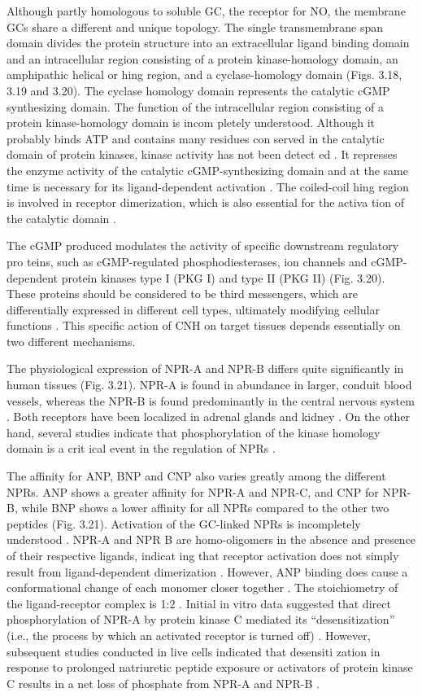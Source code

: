 \documentclass[14pt,a4paper,onecolumn]{extarticle}
\begin{document}
Although partly homologous to soluble GC, the receptor for NO, the membrane GCs share a different and unique topology. The single transmembrane span domain divides the protein structure into an extracellular ligand binding domain and an intracellular region consisting of a protein kinase-homology domain, an amphipathic helical or hing region, and a cyclase-homology domain \citep{165} (Figs. 3.18, 3.19 and 3.20). The cyclase homology domain represents the catalytic cGMP synthesizing domain. The function of the intracellular region consisting of a protein kinase-homology domain is incom pletely understood. Although it probably binds ATP and contains many residues con served in the catalytic domain of protein kinases, kinase activity has not been detect ed \citep{165}. It represses the enzyme activity of the catalytic cGMP-synthesizing domain and at the same time is necessary for its ligand-dependent activation \citep{154}. The coiled-coil hing region is involved in receptor dimerization, which is also essential for the activa tion of the catalytic domain \citep{165}.

The cGMP produced modulates the activity of specific downstream regulatory pro teins, such as cGMP-regulated phosphodiesterases, ion channels and cGMP-dependent protein kinases type I (PKG I) and type II (PKG II) (Fig. 3.20). These proteins should be considered to be third messengers, which are differentially expressed in different cell types, ultimately modifying cellular functions \citep{166}\citep{167}. This specific action of CNH on target tissues depends essentially on two different mechanisms.

The physiological expression of NPR-A and NPR-B differs quite significantly in human tissues (Fig. 3.21). NPR-A is found in abundance in larger, conduit blood vessels, whereas the NPR-B is found predominantly in the central nervous system \citep{168}. Both receptors have been localized in adrenal glands and kidney \citep{168}. On the other hand, several studies indicate that phosphorylation of the kinase homology domain is a crit ical event in the regulation of NPRs \citep{169-171}.

The affinity for ANP, BNP and CNP also varies greatly among the different NPRs.  ANP shows a greater affinity for NPR-A and NPR-C, and CNP for NPR-B, while BNP shows a lower affinity for all NPRs compared to the other two peptides (Fig. 3.21).  Activation of the GC-linked NPRs is incompletely understood \citep{172}. NPR-A and NPR B are homo-oligomers in the absence and presence of their respective ligands, indicat ing that receptor activation does not simply result from ligand-dependent dimerization \citep{173}. However, ANP binding does cause a conformational change of each monomer closer together \citep{172-176}. The stoichiometry of the ligand-receptor complex is 1:2 \citep{177}.  Initial in vitro data suggested that direct phosphorylation of NPR-A by protein kinase C mediated its “desensitization” (i.e., the process by which an activated receptor is turned off) \citep{178}. However, subsequent studies conducted in live cells indicated that desensiti zation in response to prolonged natriuretic peptide exposure or activators of protein kinase C results in a net loss of phosphate from NPR-A and NPR-B \citep{171}\citep{179-182}.
\end{document}
